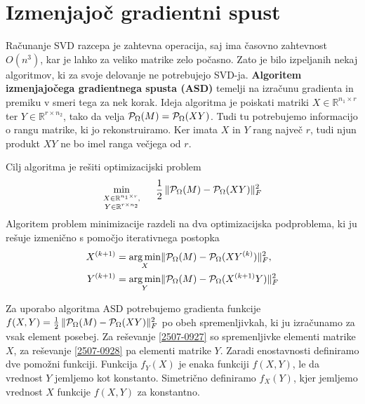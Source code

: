 \section{Izmenjajoč gradientni spust}
Računanje SVD razcepa je zahtevna operacija, saj ima časovno zahtevnost
$O(n^3)$, kar je lahko za veliko matrike zelo počasno. Zato je bilo izpeljanih nekaj algoritmov, ki za svoje delovanje ne potrebujejo SVD-ja. \textbf{Algoritem izmenjajočega gradientnega spusta (ASD)} \cite{AST-TK15} 
temelji na izračunu gradienta in premiku
v smeri tega za nek korak. Ideja algoritma je poiskati matriki $X \in \mathbb{R}^{n_1 \times r}$ ter $Y \in \mathbb{R}^{r \times n_2}$, tako da velja $\mathcal{P}_\Omega(M) = \mathcal{P}_\Omega(XY)$. Tudi tu potrebujemo informacijo o rangu matrike, ki jo rekonstruiramo. Ker imata $X$ in $Y$ rang največ $r$, tudi njun produkt $XY$ ne bo imel ranga večjega od $r$. 

Cilj algoritma je rešiti optimizacijski problem
\[
    \min_{\substack{X\in \mathbb{R}^{n_1 \times r}, \\Y \in \mathbb{R}^{r \times n_2}}} \hspace{0.5cm} \frac{1}{2}\, \lVert\mathcal{P}_\Omega(M) - \mathcal{P}_\Omega(XY)\rVert_F^2
\] 
Algoritem problem minimizacije razdeli na dva optimizacijska podproblema, ki ju rešuje izmenično s pomočjo iterativnega postopka
\begin{align}
\label{2507-0927}
    X^{(k+1)} &= \operatorname*{arg\,min}_{X} \lVert\mathcal{P}_\Omega(M) - \mathcal{P}_\Omega(XY^{(k)})\rVert_F^2, \\
\label{2507-0928}
    Y^{(k+1)} &= \operatorname*{arg\,min}_{Y} \lVert\mathcal{P}_\Omega(M) - \mathcal{P}_\Omega(X^{(k+1)}Y)\rVert_F^2
\end{align}


Za uporabo algoritma ASD potrebujemo gradienta funkcije $f(X,Y) = \frac{1}{2}\, \lVert\mathcal{P}_\Omega(M) - \mathcal{P}_\Omega(XY)\rVert_F^2$ po obeh spremenljivkah, ki ju izračunamo za vsak element posebej.
Za reševanje \eqref{2507-0927} so spremenljivke elementi matrike $X$,
za reševanje \eqref{2507-0928} pa elementi matrike $Y$. Zaradi enostavnosti definiramo dve pomožni funkciji. Funkcija $f_Y(X)$ je enaka funkciji $f(X, Y)$, le da vrednost $Y$ jemljemo kot konstanto. Simetrično definiramo $f_X(Y)$, kjer jemljemo vrednost $X$ funkcije $f(X, Y)$ za konstantno. 

